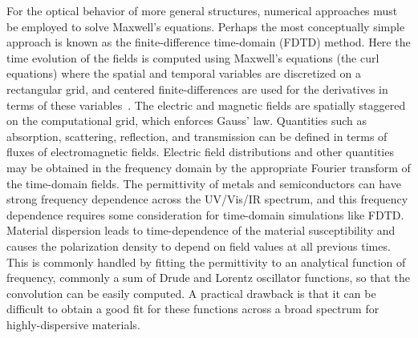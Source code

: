 \documentclass[review]{elsarticle}
\begin{document}
For the optical behavior of more general structures, numerical approaches must be employed to solve Maxwell's equations.  Perhaps the
most conceptually simple approach is known as the finite-difference time-domain (FDTD) method.  Here the time evolution of the fields
is computed using Maxwell's equations (the curl equations) where the spatial and temporal variables are discretized on a rectangular
grid, and centered finite-differences are used for the derivatives in terms of these variables~\cite{Taflove_FDTD}.
The electric and magnetic fields are spatially
staggered on the computational grid, which enforces Gauss' law.  Quantities such as absorption, scattering, reflection, and transmission
can be defined in terms of fluxes of electromagnetic fields.  Electric field distributions and other quantities may be obtained in the
frequency domain by the appropriate Fourier transform of the time-domain fields.  The permittivity of metals and semiconductors can
have strong frequency dependence across the UV/Vis/IR spectrum, and this frequency dependence requires some consideration for time-domain
simulations like FDTD.  
Material dispersion leads to time-dependence of the material susceptibility and 
causes the polarization
density to depend on field values at all previous times.  
This is commonly handled by fitting the permittivity to an analytical
function of frequency, commonly a sum of Drude and Lorentz oscillator functions, so that the convolution can be easily computed.  A
practical drawback is that it can be difficult to obtain a good fit for these functions across a broad spectrum for highly-dispersive materials.
\end{document}
